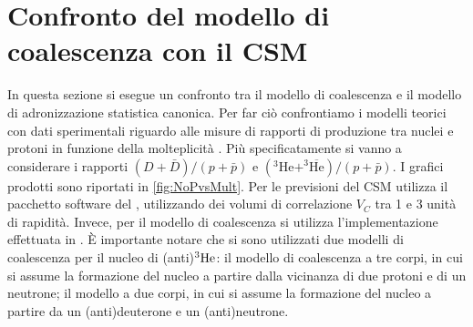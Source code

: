 \section{Confronto del modello di coalescenza con il CSM}
In questa sezione si esegue un confronto tra il modello di coalescenza e il modello di adronizzazione statistica canonica.
Per far ciò confrontiamo i modelli teorici con dati sperimentali riguardo alle misure di rapporti di produzione tra nuclei e protoni in funzione della molteplicità \cite{alice_2022_coal_formula}.
Più specificatamente si vanno a considerare i rapporti $(D+\bar D)/(p + \bar p)$ e $(^3\text{He} + ^3\overline{\text{He}})/(p+\bar p)$.
I grafici prodotti sono riportati in \autoref{fig:NoPvsMult}.
Per le previsioni del CSM utilizza il pacchetto software del  \cite{Vovchenko_2019_thermal_FIST}, utilizzando dei volumi di correlazione $V_C$ tra 1 e 3 unità di rapidità.
Invece, per il modello di coalescenza si utilizza l'implementazione effettuata in \cite{Sun_2019_coal_model}.
È importante notare che si sono utilizzati due modelli di coalescenza per il nucleo di (anti)$^{3}{\rm He}$: il modello di coalescenza a tre corpi, in cui si assume la formazione del nucleo a partire dalla vicinanza di due protoni e di un neutrone; il modello a due corpi, in cui si assume la formazione del nucleo a partire da un (anti)deuterone e un (anti)neutrone. 
